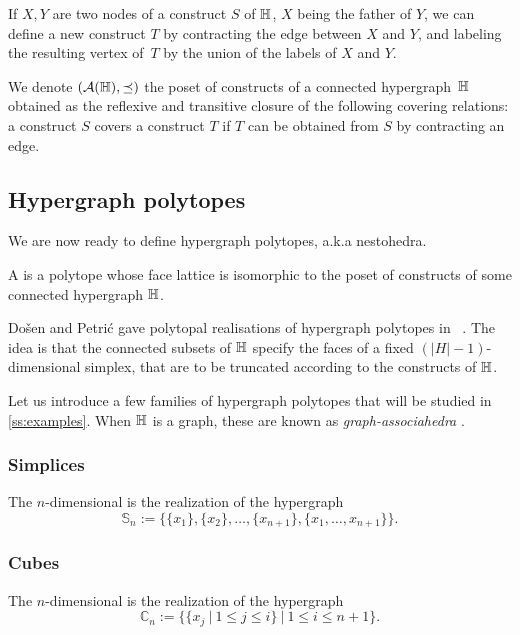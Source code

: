 If $X,Y$ are two nodes of a construct $S$ of ${\mathbb H}$, $X$ being the father of $Y$, we can define a new construct $T$ by contracting the edge between $X$ and $Y$, and labeling the resulting vertex of~$T$ by the union of the labels of $X$ and $Y$. 

\begin{definition}
    We denote $({\cal A}({\mathbb H}),\preceq)$ the poset of constructs of a connected hypergraph~${\mathbb H}$ obtained as the reflexive and transitive closure of the following covering relations: a construct $S$ covers a construct $T$ if $T$ can be obtained from $S$ by contracting an edge.
\end{definition}


\subsection{Hypergraph polytopes}
\label{ss:hypergraph-polytopes}

We are now ready to define hypergraph polytopes, a.k.a nestohedra.

\begin{definition}
    A  is a polytope whose face lattice is isomorphic to the poset of constructs of some connected hypergraph ${\mathbb H}$.
\end{definition}

Do\v sen and Petri\'c gave polytopal realisations of hypergraph polytopes in ~\cite{DP-HP}.
The idea is that the connected subsets of ${\mathbb H}$ specify the faces of a fixed $(|H|-1)$-dimensional simplex, that are to be truncated according to the constructs of ${\mathbb H}$.

Let us introduce a few families of hypergraph polytopes that will be studied in \cref{ss:examples}.
When ${\mathbb H}$ is a graph, these are known as \emph{graph-associahedra} \cite{CD-CCGA}.

\subsubsection{Simplices}
The $n$-dimensional  is the realization of the hypergraph 
$$\mathbb{S}_n:=\{\{x_1\},\{x_2\},\ldots,\{x_{n+1}\},\{x_1,\ldots,x_{n+1}\}\}.$$

\subsubsection{Cubes}
The $n$-dimensional  is the realization of the hypergraph
$$\mathbb{C}_n:=\{\{x_j \ | \ 1 \leq j \leq i \} \ | \ 1 \leq i \leq n+1\}.$$

